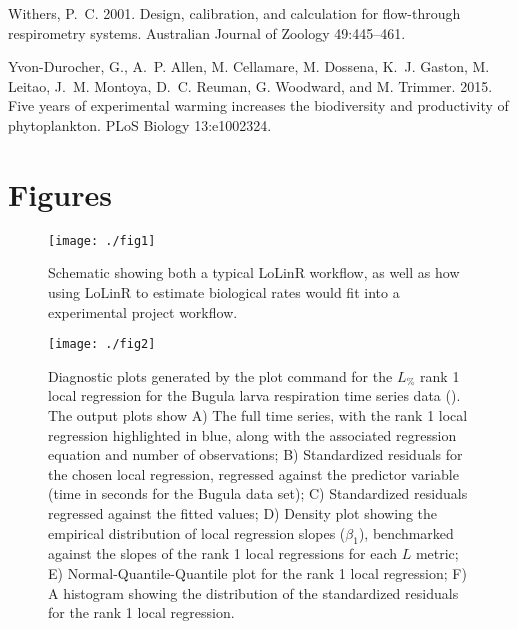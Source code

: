 \documentclass[11pt]{article}
\newcommand{\code}{\fontfamily{pcr}\selectfont}
\begin{document}
\begin{thebibliography}{}
Withers, P.~C. 2001.
\newblock Design, calibration, and calculation for flow-through respirometry systems.
\newblock Australian Journal of Zoology 49:445--461.

Yvon-Durocher, G., A.~P. Allen, M. Cellamare, M. Dossena, K.~J. Gaston, M. Leitao, J.~M. Montoya, D.~C. Reuman, G. Woodward, and M. Trimmer. 2015.
\newblock Five years of experimental warming increases the biodiversity and productivity of phytoplankton.
\newblock PLoS Biology 13:e1002324.

\end{thebibliography}

\newpage{}

\section*{Figures}
 
\begin{figure}[!ht]
\texttt{[image: ./fig1]}
\caption{Schematic showing both a typical {\code LoLinR} workflow, as well as how using {\code LoLinR} to estimate biological rates would fit into a experimental project workflow.}
\label{Fig:fig1.eps}
\end{figure}
\newpage{}

\begin{figure}[!ht]
\texttt{[image: ./fig2]}
\caption{Diagnostic plots generated by the {\code plot} command for the $L_{\%}$ rank 1 local regression for the Bugula larva respiration time series data (\citealt{Pettersen2015}). The output plots show A) The full time series, with the rank 1 local regression highlighted in blue, along with the associated regression equation and number of observations; B) Standardized residuals for the chosen local regression, regressed against the predictor variable (time in seconds for the Bugula data set); C) Standardized residuals regressed against the fitted values; D) Density plot showing the empirical distribution of local regression slopes ($\beta_1$), benchmarked against the slopes of the rank 1 local regressions for each $L$ metric; E) Normal-Quantile-Quantile plot for the rank 1 local regression; F) A histogram showing the distribution of the standardized residuals for the rank 1 local regression.}
\label{Fig:fig2.eps}
\end{figure}
\newpage{}
\end{document}

